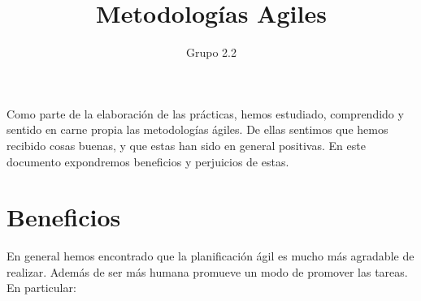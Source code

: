 \documentclass[11pt,a4paper]{article}
\title{Metodologías Agiles}
\author{Grupo 2.2 }
\date{}
\begin{document}
\maketitle

Como parte de la elaboración de las prácticas, hemos estudiado, comprendido y sentido en carne propia las metodologías ágiles. De ellas sentimos que hemos recibido cosas buenas, y que estas han sido en general positivas. En este documento expondremos beneficios y perjuicios de estas.

\section{Beneficios}

En general hemos encontrado que la planificación ágil es mucho más agradable de realizar. Además de ser más humana promueve un modo de promover las tareas. En particular:
\end{document}
